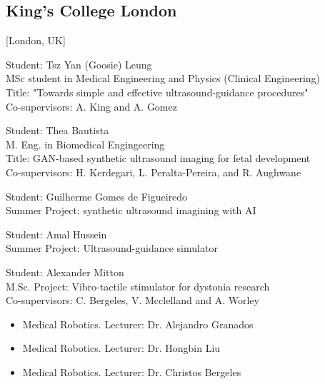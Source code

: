 \documentclass{mycv}
\begin{document}
\subsection{King's College London}[London, UK]
\vspace{1mm}
\begin{positions}
\end{positions}

Student: Tsz Yan (Goosie) Leung  \\
MSc student in Medical Engineering and Physics (Clinical Engineering) \\
Title: "Towards simple and effective ultrasound-guidance procedures" \\
Co-supervisors: A. King and A. Gomez

Student: Thea Bautista  \\
M. Eng. in Biomedical Engingeering \\
Title: GAN-based synthetic ultrasound imaging for fetal development \\
Co-supervisors: H. Kerdegari, L. Peralta-Pereira, and R. Aughwane

Student: Guilherme Gomes de Figueiredo  \\
Summer Project: synthetic ultrasound imagining with AI

Student: Amal Hussein  \\
Summer Project: Ultrasound-guidance simulator

Student: Alexander Mitton  \\
M.Sc. Project: Vibro-tactile stimulator for dystonia research \\
Co-supervisors: C. Bergeles, V. Mcclelland and A. Worley

\begin{positions}
\end{positions}
\begin{itemize}
	I led topic presentations and preparation for student evaluation
	\vspace{-1mm}
	\item Medical Robotics. Lecturer: Dr. Alejandro Granados 
	\item Medical Robotics. Lecturer: Dr. Hongbin Liu 
	\item Medical Robotics. Lecturer: Dr. Christos Bergeles 
\end{itemize}
\vspace{\parskip}
\end{document}
